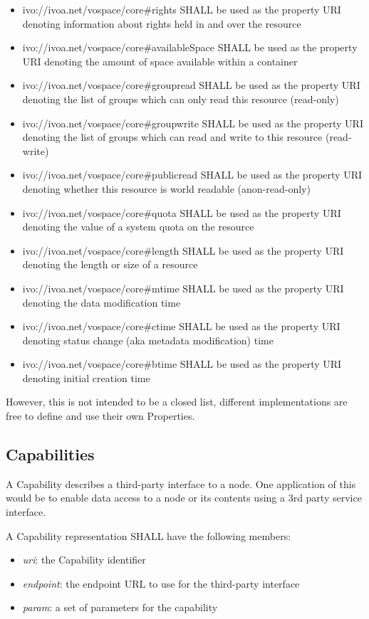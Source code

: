 \documentclass[11pt,a4paper]{ivoa}
\begin{document}
\begin{itemize}
    \item ivo://ivoa.net/vospace/core\#rights SHALL be used as the property URI denoting information about rights held in and over the resource
    \item ivo://ivoa.net/vospace/core\#availableSpace SHALL be used as the property URI denoting the amount of space available within a container
    \item ivo://ivoa.net/vospace/core\#groupread SHALL be used as the property URI denoting the list of groups which can only read this resource (read-only)
    \item ivo://ivoa.net/vospace/core\#groupwrite SHALL be used as the property URI denoting the list of groups which can read and write to this resource (read-write)
    \item ivo://ivoa.net/vospace/core\#publicread SHALL be used as the property URI denoting whether this resource is world readable (anon-read-only)
    \item ivo://ivoa.net/vospace/core\#quota SHALL be used as the property URI denoting the value of a system quota on the resource
    \item ivo://ivoa.net/vospace/core\#length SHALL be used as the property URI denoting the length or size of a resource
    \item ivo://ivoa.net/vospace/core\#mtime SHALL be used as the property URI denoting the data modification time
    \item ivo://ivoa.net/vospace/core\#ctime SHALL be used as the property URI denoting status change (aka metadata modification) time
    \item ivo://ivoa.net/vospace/core\#btime SHALL be used as the property URI denoting initial creation time
\end{itemize}

However, this is not intended to be a closed list, different implementations are free to define and use their own Properties.

\subsection{Capabilities}
A Capability describes a third-party interface to a node. One application of this would be to enable data access to a node or its contents using a 3rd party service interface.

A Capability representation SHALL have the following members:

\begin{itemize}
    \item \emph{uri}: the Capability identifier
    \item \emph{endpoint}: the endpoint URL to use for the third-party interface
    \item \emph{param}: a set of parameters for the capability
\end{itemize}
\end{document}

